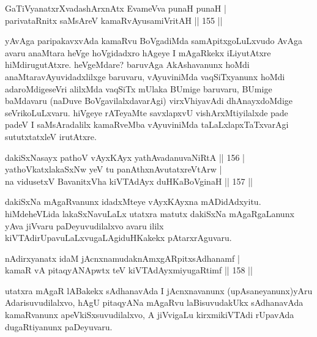 \begin{shl}
GaTiVyanatxrXvadashArxnAtx EvameVva punaH punaH | \\
parivataRnitx saMsAreV kamaRvAyusamiVritAH \hfill|| 155 || 
\end{shl}

\begin{artha}
yAvAga paripakavxvAda kamaRvu BoVgadiMda samApitxgoLuLxvudo AvAga avaru anaMtara heVge hoVgidadxro hAgeye I mAgaRkekx iLiyutAtxre hiMdirugutAtxre. heVgeMdare? baruvAga AkAshavanunx hoMdi anaMtaravAyuvidadxlilxge baruvaru, vAyuviniMda vaqSiTxyanunx hoMdi adaroMdigeseVri alilxMda vaqSiTx mUlaka BUmige baruvaru, BUmige baMdavaru (naDuve BoVgavilalxdavarAgi) virxVhiyavAdi dhAnayxdoMdige seVrikoLuLxvaru. hiVgeye rATeyaMte savxlapxvU  vishArxMtiyilalxde pade padeV I saMsAradalilx kamaRveMba vAyuviniMda taLaLxlapxTaTxvarAgi sututxtatxleV irutAtxre.
\end{artha}


\begin{shl}
dakiSxNasayx pathoV vAyxKAyx yathAvadanuvaNiRtA \hfill|| 156 | \\
yathoVkatxlakaSxNw yeV tu panAthxnAvutatxreVtArw | \\
na vidusetxV BavanitxVha kiVTAdAyx duHKaBoVginaH \hfill|| 157 || 
\end{shl}

\begin{artha}
dakiSxNa mAgaRvanunx idadxMteye vAyxKAyxna mADidAdxyitu. hiMdeheVLida lakaSxNavuLaLx utatxra matutx dakiSxNa mAgaRgaLanunx yAva jiVvaru paDeyuvudilalxvo avaru ililx kiVTAdirUpavuLaLxvugaLAgiduHKakekx pAtarxrAguvaru.
\end{artha}


\begin{shl}
nA\s \s dirxyanatx idaM jAcnxnamudaknAmxgARpitxsAdhanamf | \\
kamaR vA pitaqyANApwtx teV kiVTAdAyxmiyugaRtimf \hfill|| 158 || 
\end{shl}

\begin{artha}
utatxra mAgaR lABakekx sAdhanavAda I jAcnxnavanunx (upAsaneyanunx)yAru Adarisuvudilalxvo, hAgU pitaqyANa mAgaRvu laBisuvudakUkx sAdhanavAda kamaRvanunx apeVkiSxsuvudilalxvo, A jiVvigaLu kirxmikiVTAdi rUpavAda dugaRtiyanunx paDeyuvaru.
\end{artha}

